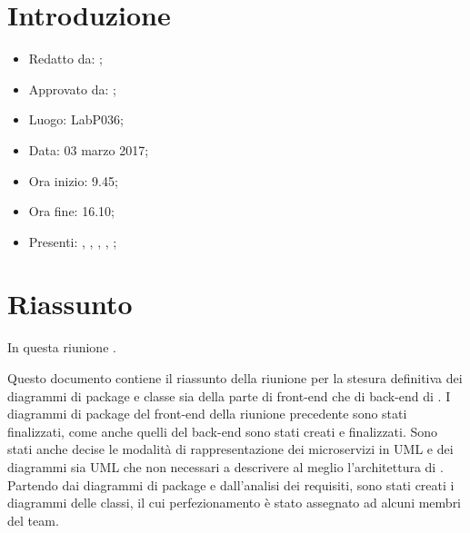 \section{Introduzione}

	\begin{itemize}
		\item Redatto da: \MC;
		\item Approvato da: \AS;
		\item Luogo: LabP036;
		\item Data: 03 marzo 2017;
		\item Ora inizio: 9.45;
		\item Ora fine: 16.10;
		\item Presenti: \AN, \AS, \DS, \MC, \NS;	
	\end{itemize}

\section{Riassunto}
In questa riunione .

Questo documento contiene il riassunto della riunione per la stesura definitiva dei diagrammi di package e classe sia della parte di front-end che di back-end di \progetto. I diagrammi di package del front-end della riunione precedente sono stati finalizzati, come anche quelli del back-end sono stati creati e finalizzati. Sono stati anche decise le modalità di rappresentazione dei microservizi in UML e dei diagrammi sia UML che non necessari a descrivere al meglio l'architettura di \progetto. Partendo dai diagrammi di package e dall'analisi dei requisiti, sono stati creati i diagrammi delle classi, il cui perfezionamento è stato assegnato ad alcuni membri del team.